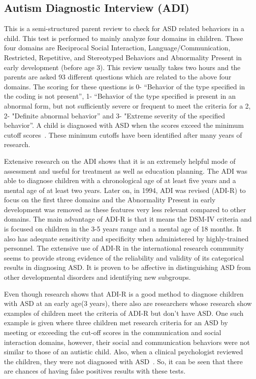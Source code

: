 \subsection{Autism Diagnostic Interview (ADI)}
This is a semi-structured parent review to check for ASD related behaviors in a child. This test is performed to mainly analyze four domains in children. These four domains are Reciprocal Social Interaction, Language/Communication, Restricted, Repetitive, and Stereotyped Behaviors and  Abnormality Present in early development (before age 3). This review usually takes two hours and the parents are asked 93 different questions which are related to the above four domains. The scoring for these questions is 	0- “Behavior of the type specified in the coding is not present”, 1- “Behavior of the type specified is present in an abnormal form, but not sufficiently severe or frequent to meet the criteria for a 2, 2- "Definite abnormal behavior” and 3- "Extreme severity of the specified behavior”. A child is diagnosed with ASD when the scores exceed the minimum cutoff scores~\cite{bone2015applying}. These minimum cutoffs have been identified after many years of research.

Extensive research on the ADI shows that it is an extremely helpful mode of assessment and useful for treatment as well as education planning. The ADI was able to diagnose children with a chronological age of at least five years and a mental age of at least two years. Later on, in 1994, ADI was revised (ADI-R) to focus on the first three domains and the Abnormality Present in early development was removed as these features very less relevant compared to other domains\cite{lord1994autism}. The main advantage of ADI-R is that it means the DSM-IV criteria and is focused on children in the 3-5 years range and a mental age of 18 months. It also has adequate sensitivity and specificity when administered by highly-trained personnel. The extensive use of ADI-R in the international research community seems to provide strong evidence of the reliability and validity of its categorical results in diagnosing ASD. It is proven to be affective in distinguishing ASD from other developmental disorders and identifying new subgroups\cite{rutter2003autism}.

Even though research shows that ADI-R is a good method to diagnose children with ASD at an early age(3 years), there also are researchers whose research show examples of children meet the criteria of ADI-R but don’t have ASD. One such example is given where three children met research criteria for an ASD by meeting or exceeding the cut-off scores in the communication and social interaction domains, however, their social and communication behaviors were not similar to those of an autistic child. Also, when a clinical psychologist reviewed the children, they were not diagnosed with ASD~\cite{reaven2008use}. So, it can be seen that there are chances of having false positives results with these tests.

